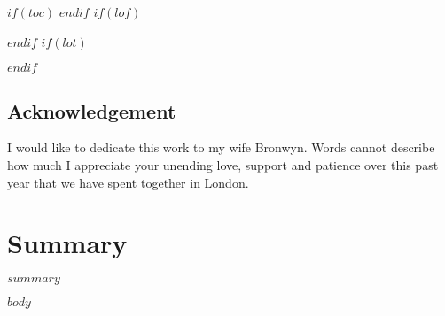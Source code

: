 \documentclass[$if(fontsize)$$fontsize$,$endif$$if(lang)$$lang$,$endif$$if(papersize)$$papersize$,$endif$$for(classoption)$$classoption$$sep$,$endfor$preprint, authoryear]{$documentclass$}
\title{
{\scshape\Large $institute$}\\
{\vskip 2.5em \scshape $title$}\\
}
\author{$author$}
\subtitle{\vspace{4em} $subtitle$} %
\date{\scshape $date$}
\begin{document}
\pagestyle{fancy}


\maketitle

\thispagestyle{empty}

\clearpage

\setcounter{page}{1}

$if(toc)$
\renewcommand{\contentsname}{Table of Contents}
\tableofcontents
$endif$
\newpage
$if(lof)$
\listoffigures
$endif$
\newpage
$if(lot)$
\listoftables
$endif$
\newpage

\begin{center}
\section*{Acknowledgement}
\end{center}
I would like to dedicate this work to my wife Bronwyn. Words cannot describe how much I appreciate your unending love, support and patience over this past year that we have spent together in London.

\clearpage

\section*{Summary}

$summary$

\clearpage


$body$

\newcommand\wordcount{
    \immediate\write18{texcount -sub=section \jobname.tex  | grep "Section" |     sed -e 's/+.*//' | sed -n \thesection p > 'count.txt'}
(words)}
\end{document}
